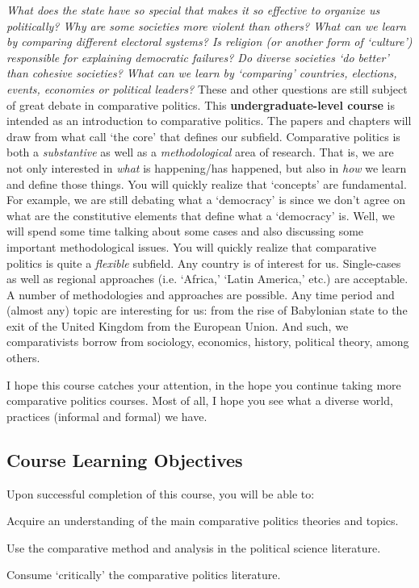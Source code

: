 \documentclass[letterpaper]{article}
\renewenvironment{itemize}{
  \begin{list}{}{
    \setlength{\leftmargin}{1.5em}
  }
}{
  \end{list}
}
\begin{document}
\emph{What does the state have so special that makes it so effective to organize us politically? Why are some societies more violent than others? What can we learn by comparing different electoral systems? Is religion (or another form of `culture') responsible for explaining democratic failures? Do diverse societies `do better' than cohesive societies? What can we learn by `comparing' countries, elections, events, economies or political leaders?} These and other questions are still subject of great debate in comparative politics. This {\bf {\color{blue}undergraduate-level course}} is intended as an introduction to comparative politics. The papers and chapters will draw from what call `the core' that defines our subfield. Comparative politics is both a \emph{substantive} as well as a \emph{methodological} area of research. That is, we are not only interested in \emph{what} is happening/has happened, but also in \emph{how} we learn and define those things. You will quickly realize that `concepts' are fundamental. For example, we are still debating what a `democracy' is since we don't agree on what are the constitutive elements that define what a `democracy' is. Well, we will spend some time talking about some cases and also discussing some important methodological issues. You will quickly realize that comparative politics is quite a \emph{flexible} subfield. Any country is of interest for us. Single-cases as well as regional approaches (i.e. `Africa,' `Latin America,' etc.) are acceptable. A number of methodologies and approaches are possible. Any time period and (almost any) topic are interesting for us: from the rise of Babylonian state to the exit of the United Kingdom from the European Union. And such, we comparativists borrow from sociology, economics, history, political theory, among others. 


I hope this course catches your attention, in the hope you continue taking more comparative politics courses. Most of all, I hope you see what a diverse world, practices (informal and formal) we have. 

\subsection*{Course Learning Objectives}
 
Upon successful completion of this course, you will be able to:

\begin{itemize}
	\item[$\bullet$] Acquire an understanding of the main comparative politics theories and topics.
	\item[$\bullet$] Use the comparative method and analysis in the political science literature.
	\item[$\bullet$] Consume `critically' the comparative politics literature.
\end{itemize}
\end{document}
